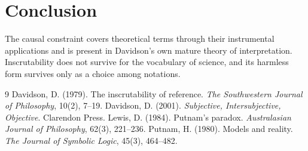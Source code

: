 \documentclass{situationist-preprint}
\begin{document}
\section{Conclusion}

The causal constraint covers theoretical terms through their instrumental applications and is present in Davidson's own mature theory of interpretation. Inscrutability does not survive for the vocabulary of science, and its harmless form survives only as a choice among notations.

\begin{thebibliography}{9}\small
{} Davidson, D. (1979). The inscrutability of reference. \emph{The Southwestern Journal of Philosophy}, 10(2), 7--19.
 Davidson, D. (2001). \emph{Subjective, Intersubjective, Objective}. Clarendon Press.
 Lewis, D. (1984). Putnam's paradox. \emph{Australasian Journal of Philosophy}, 62(3), 221--236.
 Putnam, H. (1980). Models and reality. \emph{The Journal of Symbolic Logic}, 45(3), 464--482.
\end{thebibliography}
\end{document}
